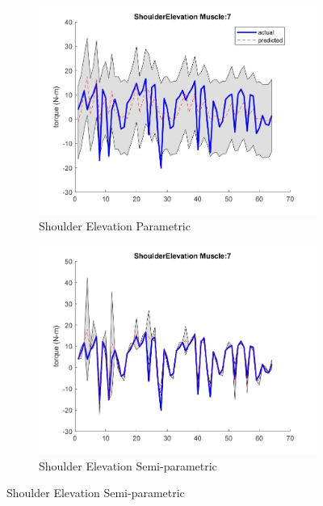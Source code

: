 \begin{figure}[htbp]
    \begin{subfigure}[b]{0.45\linewidth}
        \includegraphics[height=0.15\textheight]{Pictures/Results/GPR/ShoulderElevation_7Parametric.jpg}
        \caption{Shoulder Elevation Parametric}
    \end{subfigure}
    \hfill
    \begin{subfigure}[b]{0.45\linewidth}
        \includegraphics[height=0.15\textheight]{Pictures/Results/GPR/ShoulderElevation_7Semiparametric.jpg}
        \caption{Shoulder Elevation Semi-parametric}
    \end{subfigure}
    

\end{figure}
